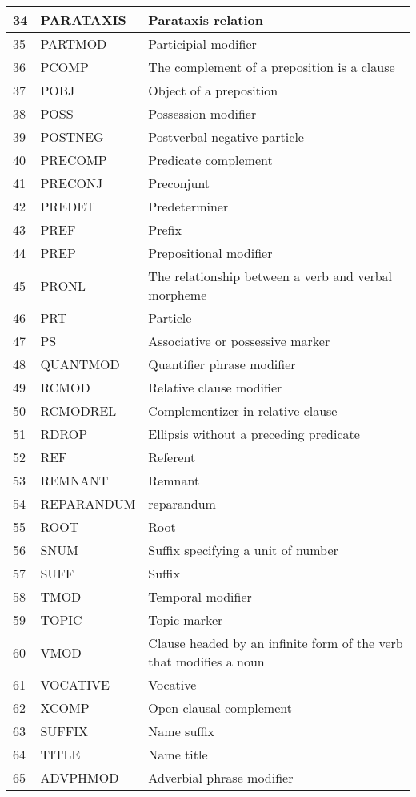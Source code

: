 \begin{longtable}{|p{1cm}|p{1.5in}|p{2.5in}|}
34&PARATAXIS&Parataxis relation \\ \hline
35&PARTMOD&Participial modifier \\ \hline
36&PCOMP&The complement of a preposition is a clause \\ \hline
37&POBJ&Object of a preposition \\ \hline
38&POSS&Possession modifier \\ \hline
39&POSTNEG&Postverbal negative particle \\ \hline
40&PRECOMP&Predicate complement \\ \hline
41&PRECONJ&Preconjunt \\ \hline
42&PREDET&Predeterminer \\ \hline
43&PREF&Prefix \\ \hline
44&PREP&Prepositional modifier \\ \hline
45&PRONL&The relationship between a verb and verbal morpheme \\ \hline
46&PRT&Particle \\ \hline
47&PS&Associative or possessive marker \\ \hline
48&QUANTMOD&Quantifier phrase modifier \\ \hline
49&RCMOD&Relative clause modifier \\ \hline
50&RCMODREL&Complementizer in relative clause \\ \hline
51&RDROP&Ellipsis without a preceding predicate \\ \hline
52&REF&Referent \\ \hline
53&REMNANT&Remnant \\ \hline
54&REPARANDUM&reparandum \\ \hline
55&ROOT&Root \\ \hline
56&SNUM&Suffix specifying a unit of number \\ \hline
57&SUFF&Suffix \\ \hline
58&TMOD&Temporal modifier \\ \hline
59&TOPIC&Topic marker \\ \hline
60&VMOD&Clause headed by an infinite form of the verb that modifies a noun \\ \hline
61&VOCATIVE&Vocative \\ \hline
62&XCOMP&Open clausal complement \\ \hline
63&SUFFIX&Name suffix \\ \hline
64&TITLE&Name title \\ \hline
65&ADVPHMOD&Adverbial phrase modifier \\ \hline

\end{longtable}
